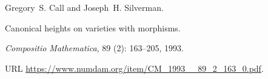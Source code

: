 Gregory~S. Call and Joseph~H. Silverman.

\newblock Canonical heights on varieties with morphisms.

\newblock \emph{Compositio Mathematica}, 89 (2): 163--205,
  1993.

\newblock URL \url{https://www.numdam.org/item/CM_1993__89_2_163_0.pdf}.

